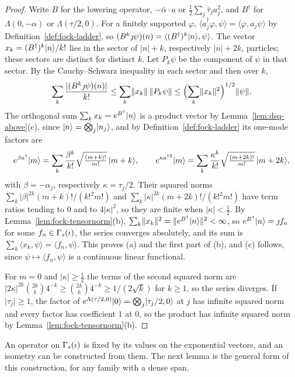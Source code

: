 \begin{veteenv}
\begin{proof}
Write $B$ for the lowering operator, $-\bar\alpha\cdot a$ or $\frac12\sum_j\bar\tau_ja_j^2$, and $B^\dagger$ for
$\Lambda(0,-\alpha)$ or $\Lambda(\tau/2,0)$. For a finitely supported $\varphi$, $\langle a_j^\dagger\varphi,\psi\rangle=
\langle\varphi,a_j\psi\rangle$ by Definition~\ref{def:fock-ladder}, so $(B^k\jmath\psi)(n)=\langle(B^\dagger)^k\lvert n\rangle,\psi\rangle$.
The vector $x_k=(B^\dagger)^k\lvert n\rangle/k!$ lies in the sector of $\lvert n\rvert+k$, respectively $\lvert n\rvert+2k$, particles;
these sectors are distinct for distinct $k$. Let $P_k\psi$ be the component of $\psi$ in that sector. By the Cauchy--Schwarz
inequality in each sector and then over $k$,
\[
 \sum_k\frac{\lvert(B^k\jmath\psi)(n)\rvert}{k!}\le\sum_k\lVert x_k\rVert\,\lVert P_k\psi\rVert
 \le\Bigl(\sum_k\lVert x_k\rVert^2\Bigr)^{1/2}\lVert\psi\rVert .
\]
The orthogonal sum $\sum_kx_k=e^{B^\dagger}\lvert n\rangle$ is a product vector by Lemma~\ref{lem:dsq-above}(c), since
$\lvert n\rangle=\bigotimes_j\lvert n_j\rangle$, and by Definition~\ref{def:fock-ladder} its one-mode factors are
\[
 e^{\beta a^\dagger}\lvert m\rangle=\sum_k\frac{\beta^k}{k!}\sqrt{\tfrac{(m+k)!}{m!}}\,\lvert m+k\rangle,\qquad
 e^{\kappa a^{\dagger2}}\lvert m\rangle=\sum_k\frac{\kappa^k}{k!}\sqrt{\tfrac{(m+2k)!}{m!}}\,\lvert m+2k\rangle,
\]
with $\beta=-\alpha_j$, respectively $\kappa=\tau_j/2$. Their squared norms $\sum_k\lvert\beta\rvert^{2k}(m+k)!/(k!^2m!)$ and
$\sum_k\lvert\kappa\rvert^{2k}(m+2k)!/(k!^2m!)$ have term ratios tending to $0$ and to $4\lvert\kappa\rvert^2$, so they are finite
when $\lvert\kappa\rvert<\frac12$. By Lemma~\ref{lem:fock-tensornorm}(b), $\sum_k\lVert x_k\rVert^2=\lVert e^{B^\dagger}\lvert n\rangle\rVert^2<\infty$,
so $e^{B^\dagger}\lvert n\rangle=\jmath f_n$ for some $f_n\in\Gamma_s(\iota)$, the series converges absolutely, and its sum is
$\sum_k\langle x_k,\psi\rangle=\langle f_n,\psi\rangle$. This proves (a) and the first part of (b), and (c) follows, since
$\psi\mapsto\langle f_n,\psi\rangle$ is a continuous linear functional.

For $m=0$ and $\lvert\kappa\rvert\ge\frac12$ the terms of the second squared norm are $\lvert2\kappa\rvert^{2k}\binom{2k}k4^{-k}\ge
\binom{2k}k4^{-k}\ge1/(2\sqrt k)$ for $k\ge1$, so the series diverges. If $\lvert\tau_j\rvert\ge1$, the factor of
$e^{\Lambda(\tau/2,0)}\lvert 0\rangle=\bigotimes_j\lvert \tau_j/2,0\rangle$ at $j$ has infinite squared norm and every factor has coefficient
$1$ at $0$, so the product has infinite squared norm by Lemma~\ref{lem:fock-tensornorm}(b).
\end{proof}

An operator on $\Gamma_s(\iota)$ is fixed by its values on the exponential vectors, and an isometry can be constructed from them. The
next lemma is the general form of this construction, for any family with a dense span.


\end{veteenv}
